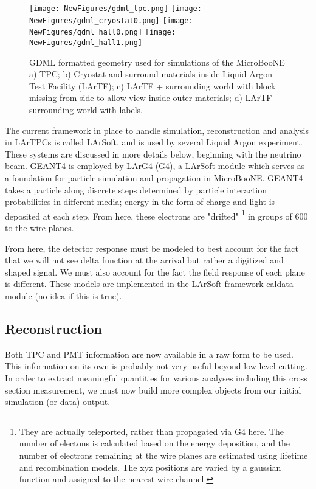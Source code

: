 \documentclass[12pt]{article}
\begin{document}
\begin{figure}[h!]
\centering
\texttt{[image: NewFigures/gdml\_tpc.png]}
\hspace{2 mm}
\texttt{[image: NewFigures/gdml\_cryostat0.png]}
\hspace{2 mm}
\texttt{[image: NewFigures/gdml\_hall0.png]}
\hspace{2 mm}
\texttt{[image: NewFigures/gdml\_hall1.png]}
\caption{GDML formatted geometry used for simulations of the MicroBooNE a) TPC; b) Cryostat and surround materials inside Liquid Argon Test Facility (LArTF); c) LArTF + surrounding world with block missing from side to allow view inside outer materials; d) LArTF + surrounding world with labels. }
\label{fig:gdml}
\end{figure}

\par The current framework in place to handle simulation, reconstruction and analysis in LArTPCs is called LArSoft, and is used by several Liquid Argon experiment.  These systems are discussed in more details below, beginning with the neutrino beam. GEANT4 is employed by LArG4 (G4), a LArSoft module which serves as a foundation for particle simulation and propagation in MicroBooNE. GEANT4 takes a particle along discrete steps determined by particle interaction probabilities in different media; energy in the form of charge and light is deposited at each step.  From here, these electrons are "drifted" \footnote{They are actually teleported, rather than propagated via G4 here.  The number of electons is calculated based on the energy deposition, and the number of electrons remaining at the wire planes are estimated using lifetime and recombination models.  The xyz positions are varied by a gaussian function and assigned to the nearest wire channel. } in groups of 600 to the wire planes.
\par From here, the detector response must be modeled to best account for the fact that we will not see delta function at the arrival but rather a digitized and shaped signal. We must also account for the fact the field response of each plane is different. These models are implemented in the LArSoft framework caldata module (no idea if this is true). 

\subsection{Reconstruction}
Both TPC and PMT information are now available in a raw form to be used. This information on its own is probably not very useful beyond low level cutting.  In order to extract meaningful quantities for various analyses including this cross section measurement, we must now build more complex objects from our initial simulation (or data) output.
\end{document}
